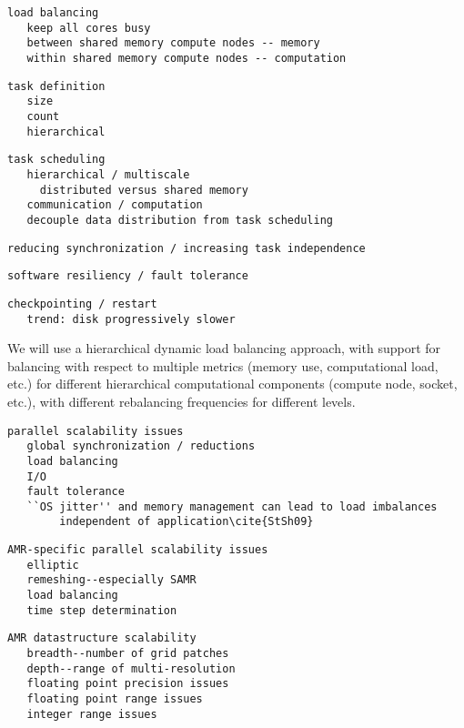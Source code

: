 \documentclass[10pt]{article}
\begin{document}
\begin{verbatim}
load balancing
   keep all cores busy
   between shared memory compute nodes -- memory
   within shared memory compute nodes -- computation
\end{verbatim}

\begin{verbatim}
task definition
   size
   count
   hierarchical
\end{verbatim}

\begin{verbatim}
task scheduling
   hierarchical / multiscale
     distributed versus shared memory
   communication / computation
   decouple data distribution from task scheduling
\end{verbatim}

\begin{verbatim}
reducing synchronization / increasing task independence
\end{verbatim}

\begin{verbatim}
software resiliency / fault tolerance
\end{verbatim}

\begin{verbatim}
checkpointing / restart
   trend: disk progressively slower
\end{verbatim}


We will use a hierarchical dynamic load balancing approach, with
support for balancing with respect to multiple metrics (memory use,
computational load, etc.) for different hierarchical computational
components (compute node, socket, etc.), with different rebalancing
frequencies for different levels.


\begin{verbatim}
parallel scalability issues
   global synchronization / reductions
   load balancing
   I/O
   fault tolerance
   ``OS jitter'' and memory management can lead to load imbalances
        independent of application\cite{StSh09}
\end{verbatim}

\begin{verbatim}
AMR-specific parallel scalability issues
   elliptic
   remeshing--especially SAMR
   load balancing
   time step determination
\end{verbatim}

\begin{verbatim}
AMR datastructure scalability
   breadth--number of grid patches
   depth--range of multi-resolution
   floating point precision issues
   floating point range issues
   integer range issues
\end{verbatim}
\end{document}

